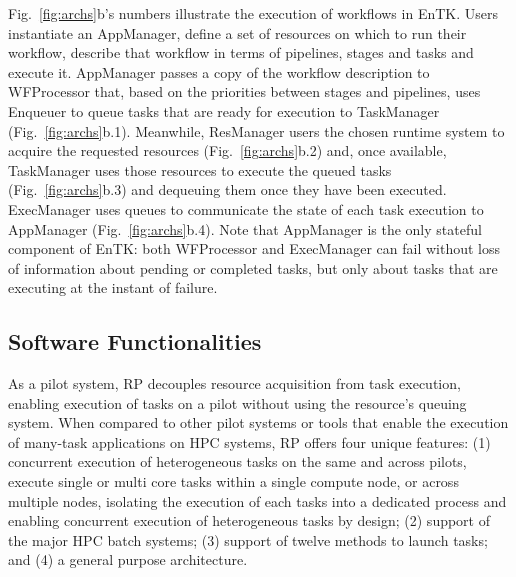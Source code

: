 \documentclass[preprint,12pt, a4paper]{elsarticle}
\begin{document}
Fig.~\ref{fig:archs}b's numbers illustrate the execution of workflows in
EnTK\@. Users instantiate an AppManager, %
define a set of resources on which to run their workflow,
describe that workflow in terms of pipelines, stages and tasks
and execute it.
AppManager passes a copy of the workflow description to WFProcessor that,
based on the priorities between stages and pipelines, uses Enqueuer to queue
tasks that are ready for execution to TaskManager (Fig.~\ref{fig:archs}b.1).
Meanwhile, ResManager users the chosen runtime system to acquire the
requested resources (Fig.~\ref{fig:archs}b.2) and, once available,
TaskManager uses those resources to execute the queued tasks
(Fig.~\ref{fig:archs}b.3) and dequeuing them once they have been executed.
ExecManager uses queues to communicate the state of each task execution to
AppManager (Fig.~\ref{fig:archs}b.4). Note that AppManager is the only
stateful component of EnTK: both WFProcessor and ExecManager can fail without
loss of information about pending or completed tasks, but only about tasks
that are executing at the instant of failure.

\subsection{Software Functionalities}\label{ssec:functionalities}


As a pilot system, RP decouples resource acquisition from task execution,
enabling execution of tasks on a pilot without using the resource's queuing
system.
%
%
When compared to other pilot systems or tools that enable the execution of
many-task applications on HPC systems, RP offers four unique features: (1)
concurrent execution of heterogeneous tasks on the same and across pilots,
execute single or multi core tasks within a single compute node, or across
multiple nodes, isolating the execution of each tasks into a dedicated
process and enabling concurrent execution of heterogeneous tasks by design;
(2) support of the major HPC batch systems; (3) support of twelve methods to
launch tasks; and (4) a general purpose architecture.
\end{document}
